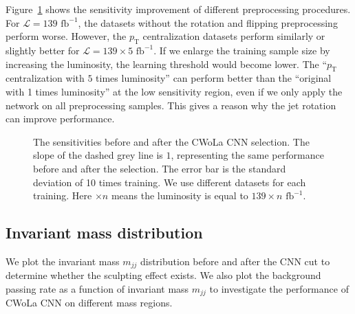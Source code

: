 \documentclass[12pt]{article}
\begin{document}
        Figure~\ref{fig:sensitivity_improvement_origin_pt_center_x1_x5} shows the sensitivity improvement of different preprocessing procedures. For $\mathcal{L} = \text{139 fb}^{-1}$, the datasets without the rotation and flipping preprocessing perform worse. However, the $p_{\text{T}}$ centralization datasets perform similarly or slightly better for $\mathcal{L} =  139 \times 5 \text{ fb}^{-1}$. If we enlarge the training sample size by increasing the luminosity, the learning threshold would become lower. The ``$p_{\text{T}}$ centralization with $5$ times luminosity'' can perform better than the ``original with 1 times luminosity'' at the low sensitivity region, even if we only apply the network on all preprocessing samples. This gives a reason why the jet rotation can improve performance.
        \begin{figure}[htpb]
            \centering
            \caption{The sensitivities before and after the CWoLa CNN selection. The slope of the dashed grey line is $1$, representing the same performance before and after the selection. The error bar is the standard deviation of 10 times training. We use different datasets for each training. Here $\times n$ means the luminosity is equal to $139 \times n \text{ fb}^{-1}$.}
            \label{fig:sensitivity_improvement_origin_pt_center_x1_x5}
        \end{figure}
    \subsection{Invariant mass distribution}%
    \label{sub:invariant_mass_distribution}
        We plot the invariant mass $m_{jj}$ distribution before and after the CNN cut to determine whether the sculpting effect exists. We also plot the background passing rate as a function of invariant mass $m_{jj}$ to investigate the performance of CWoLa CNN on different mass regions.
\end{document}
